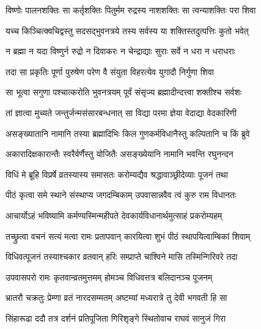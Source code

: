 \twolineshloka
{विष्णोः पालनशक्तिः सा कर्तृशक्तिः पितुर्मम}
{रुद्रस्य नाशशक्तिः सा त्वन्याशक्तिः परा शिवा}%

\twolineshloka
{यच्च किञ्चित्क्वचिद्वस्तु सदसद्‌भुवनत्रये}
{तस्य सर्वस्य या शक्तिस्तदुत्पत्तिः कुतो भवेत्}%

\twolineshloka
{न ब्रह्मा न यदा विष्णुर्न रुद्रो न दिवाकरः}
{न चेन्द्राद्याः सुराः सर्वे न धरा न धराधराः}%

\twolineshloka
{तदा सा प्रकृतिः पूर्णा पुरुषेण परेण वै}
{संयुता विहरत्येव युगादौ निर्गुणा शिवा}%

\twolineshloka
{सा भूत्वा सगुणा पश्चात्करोति भुवनत्रयम्}
{पूर्वं संसृज्य ब्रह्मादीन्दत्त्वा शक्तीश्च सर्वशः}%

\twolineshloka
{तां ज्ञात्वा मुच्यते जन्तुर्जन्मसंसारबन्धनात्}
{सा विद्या परमा ज्ञेया वेदाद्या वेदकारिणी}%

\twolineshloka
{असङ्ख्यातानि नामानि तस्या ब्रह्मादिभिः किल}
{गुणकर्मविधानैस्तु कल्पितानि च किं ब्रुवे}%

\twolineshloka
{अकारादिक्षकारान्तैः स्वरैर्वर्णैस्तु योजितैः}
{असङ्ख्येयानि नामानि भवन्ति रघुनन्दन}%




\twolineshloka
{विधिं मे ब्रूहि विप्रर्षे व्रतस्यास्य समासतः}
{करोम्यद्यैव श्रद्धावाञ्छ्रीदेव्याः पूजनं तथा}%



\twolineshloka
{पीठं कृत्वा समे स्थाने संस्थाप्य जगदम्बिकाम्}
{उपवासान्नवैव त्वं कुरु राम विधानतः}%

\twolineshloka
{आचार्योऽहं भविष्यामि कर्मण्यस्मिन्महीपते}
{देवकार्यविधानार्थमुत्साहं प्रकरोम्यहम्}%



\twolineshloka
{तच्छ्रुत्वा वचनं सत्यं मत्वा रामः प्रतापवान्}
{कारयित्वा शुभं पीठं स्थापयित्वाम्बिकां शिवाम्}%

\twolineshloka
{विधिवत्पूजनं तस्याश्चकार व्रतवान् हरिः}
{सम्प्राप्ते चाश्विने मासि तस्मिन्गिरिवरे तदा}%

\twolineshloka
{उपवासपरो रामः कृतवान्व्रतमुत्तमम्}
{होमञ्च विधिवत्तत्र बलिदानञ्च पूजनम्}%

\twolineshloka
{भ्रातरौ चक्रतुः प्रेम्णा व्रतं नारदसम्मतम्}
{अष्टम्यां मध्यरात्रे तु देवी भगवती हि सा}%

\twolineshloka
{सिंहारूढा ददौ तत्र दर्शनं प्रतिपूजिता}
{गिरिशृङ्गे स्थितोवाच राघवं सानुजं गिरा}%

